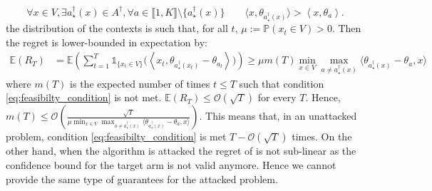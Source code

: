 \begin{equation*}    
\forall x\in V, \exists a^{\dagger}_{\star}(x)\in A^\dagger, \forall a\in \llbracket 1, K\rrbracket\setminus\{a^{\dagger}_{\star}(x)\} \qquad \langle x, \theta_{a^{\dagger}_{\star}(x)}\rangle > \left\langle x, \theta_{a}\right\rangle.
\end{equation*}
 the distribution of the contexts is such that, for all $t$, $\mu := \mathbb{P}\left(x_{t}\in V\right) >0$.
Then\changebr{,} the regret is lower-bounded in expectation by:
\begin{align*}
    \mathbb{E}(R_{T}) &= \mathbb{E}\left(\sum_{t=1}^{T} \mathds{1}_{\{x_{t}\in V\}}\big( \left\langle x_{t}, \theta_{a^{\dagger}_{\star}(x_{t})} - \theta_{a_{t}}\right\rangle\big)\right) \geq \mu m(T) \min_{x\in V} \max_{a\neq a^{\dagger}_\star(x)} \langle \theta_{a^{\dagger}_{\star}(x)} - \theta_{a}, x\rangle
\end{align*}
where $m(T)$ is the expected number of times $t\leq T$ such that condition \eqref{eq:feasibilty_condition} is not met.   $\mathbb{E}(R_{T}) \leq \mathcal{O}(\sqrt{T})$ for every $T$. Hence, $m(T) \leq \mathcal{O}\left(\frac{\sqrt{T}}{\mu\min_{x\in V}\max_{a\neq a^{\dagger}_\star(x)} \langle \theta_{a^{\dagger}_{\star}(x)} - \theta_{a}, x\rangle}\right)$. This means that, in an unattacked problem, condition \eqref{eq:feasibilty_condition} is met $T - \mathcal{O}(\sqrt{T})$ times. On the other hand, when the algorithm is attacked the regret of \linucb is not sub-linear as the confidence bound for the target arm is not valid anymore. Hence we cannot provide the same type of guarantees for the attacked problem.


